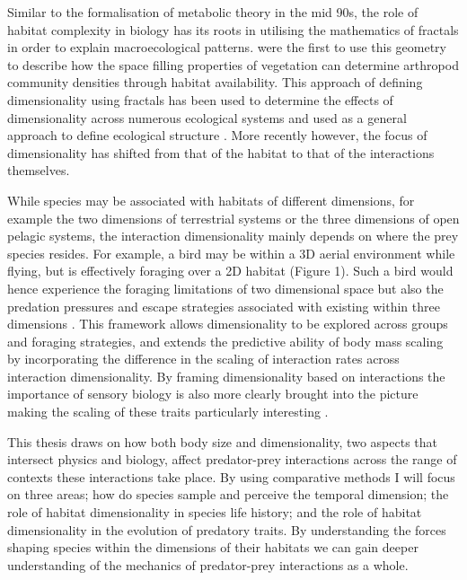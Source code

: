 Similar to the formalisation of metabolic theory in the mid 90s, the role of habitat complexity in biology has its roots in utilising the mathematics of fractals in order to explain macroecological patterns. \cite{morse1985fractal} were the first to use this geometry to describe how the space filling properties of vegetation can determine arthropod community densities through habitat availability. This approach of defining dimensionality using fractals has been used to determine the effects of dimensionality across numerous ecological systems \citep{kenkel1996fractals,shorrocks1991fractal,gunnarsson1992fractal,gee1994body,jeffries1993invertebrate} and used as a general approach to define ecological structure \citep{cohen1995marine,henderson2010linking}. More recently however, the focus of dimensionality has shifted from that of the habitat to that of the interactions themselves.


While species may be associated with habitats of different dimensions, for example the two dimensions of terrestrial systems or the three dimensions of open pelagic systems, the interaction dimensionality mainly depends on where the prey species resides. For example, a bird may be within a 3D aerial environment while flying, but is effectively foraging over a 2D habitat (Figure 1). Such a bird would hence experience the foraging limitations of two dimensional space but also the predation pressures and escape strategies associated with existing within three dimensions \citep{pawar2012dimensionality}. This framework allows dimensionality to be explored across groups and foraging strategies, and extends the predictive ability of body mass scaling by incorporating the difference in the scaling of interaction rates across interaction dimensionality. By framing dimensionality based on interactions the importance of sensory biology is also more clearly brought into the picture making the scaling of these traits particularly interesting \citep{mcgill2006allometric,kiltie2000scaling,howland2004allometry}. 




This thesis draws on how both body size and dimensionality, two aspects that intersect physics and biology, affect predator-prey interactions across the range of contexts these interactions take place. By using comparative methods I will focus on three areas; how do species sample and perceive the temporal dimension; the role of habitat dimensionality in species life history; and the role of habitat dimensionality in the evolution of predatory traits. By understanding the forces shaping species within the dimensions of their habitats we can gain deeper understanding of the mechanics of predator-prey interactions as a whole.\\


